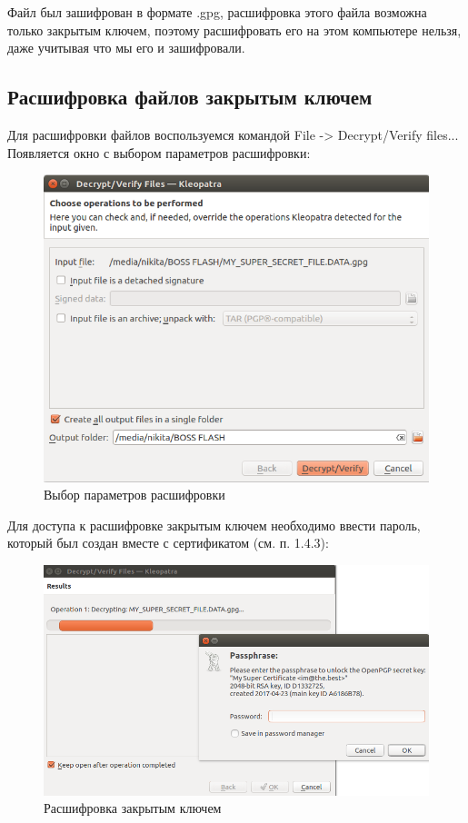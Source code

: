 \documentclass[14pt,a4paper,report]{report}
\begin{document}
Файл был зашифрован в формате .gpg, расшифровка этого файла возможна только закрытым ключем, поэтому расшифровать его на этом компьютере нельзя, даже учитывая что мы его и зашифровали.

\subsection{Расшифровка файлов закрытым ключем}

Для расшифровки файлов воспользуемся командой File -> Decrypt/Verify files... Появляется окно с выбором параметров расшифровки:

\begin{figure}[h!]
	\centering
	\includegraphics[scale = 0.51]{images/1_6.png}
	
	\caption{Выбор параметров расшифровки}
	\label{image:10}
\end{figure}

Для доступа к расшифровке закрытым ключем необходимо ввести пароль, который был создан вместе с сертификатом (см. п. 1.4.3):

\begin{figure}[h!]
	\centering
	\includegraphics[scale = 0.51]{images/1_7.png}
	
	\caption{Расшифровка закрытым ключем}
	\label{image:11}
\end{figure}
\end{document}
